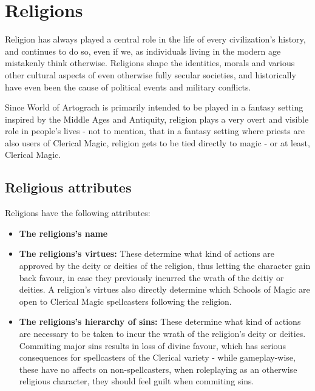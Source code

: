\section{Religions}
Religion has always played a central role in the life of every civilization's history, and continues to do so, even if we, as individuals living in the modern age mistakenly think otherwise. Religions shape the identities, morals and various other cultural aspects of even otherwise fully secular societies, and historically have even been the cause of political events and military conflicts.

Since World of Artograch is primarily intended to be played in a fantasy setting inspired by the Middle Ages and Antiquity, religion plays a very overt and visible role in people's lives - not to mention, that in a fantasy setting where priests are also users of Clerical Magic, religion gets to be tied directly to magic - or at least, Clerical Magic.

\subsection{Religious attributes}
Religions have the following attributes:
\begin{itemize}
\item \textbf{The religions's name}
\item \textbf{The religions's virtues:} These determine what kind of actions are approved by the deity or deities of the religion, thus letting the character gain back favour, in case they previously incurred the wrath of the deitiy or deities. A religion's virtues also directly determine which Schools of Magic are open to Clerical Magic spellcasters following the religion.
\item \textbf{The religions's hierarchy of sins:} These determine what kind of actions are necessary to be taken to incur the wrath of the religion's deity or deities. Commiting major sins results in loss of divine favour, which has serious consequences for spellcasters of the Clerical variety - while gameplay-wise, these have no affects on non-spellcasters, when roleplaying as an otherwise religious character, they should feel guilt when commiting sins.
\end{itemize}
